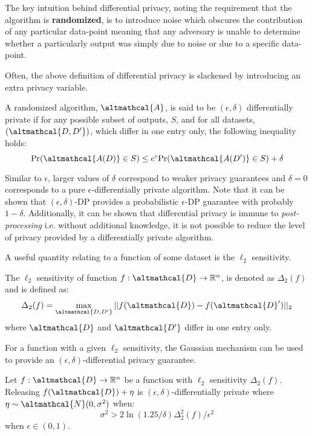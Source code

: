 The key intuition behind differential privacy, noting the requirement that the algorithm is \textbf{randomized}, is to introduce noise which obscures the contribution of any particular data-point meaning that any adversary is unable to determine whether a particularly output was simply due to noise or due to a specific data-point. 

Often, the above definition of differential privacy is slackened by introducing an extra privacy variable. 

\begin{definition}
	\label{def:epdp}
	 A randomized algorithm, $\altmathcal{A}$, is said to be $(\epsilon, \delta)$ differentially private if for any possible subset of outputs, $S$, and for all datasets, $(\altmathcal{D, D'})$, which differ in one entry only, the following inequality holds:
	\begin{equation}
	\text{Pr}(\altmathcal{A(D)} \in S) \leq e^\epsilon \text{Pr}(\altmathcal{A(D')} \in S) + \delta
	\end{equation}
\end{definition}
Similar to $\epsilon$, larger values of $\delta$ correspond to weaker privacy guarantees and $\delta=0$ corresponds to a pure $\epsilon$-differentially private algorithm. Note that it can be shown that $(\epsilon, \delta)$-DP provides a probabilistic $\epsilon$-DP guarantee with probably $1-\delta$. Additionally, it can be shown that differential privacy is immune to \emph{post-processing} i.e. without additional knowledge, it is not possible to reduce the level of privacy provided by a differentially private algorithm. \cite{foundations}

A useful quantity relating to a function of some dataset is the $\ell_2$ sensitivity. 
\begin{definition}
	The $\ell_2$ sensitivity of function $f: \altmathcal{D} \rightarrow \mathbb{R}^n$, is denoted as $\Delta_2(f)$ and is defined as:
	\begin{align}
		\Delta_2(f) = \max_{\altmathcal{D, D'}} || f(\altmathcal{D}) - f(\altmathcal{D}')||_2
	\end{align}
	where $\altmathcal{D}$ and $\altmathcal{D'}$ differ in one entry only. 
\end{definition}
For a function with a given $\ell_2$ sensitivity, the Gaussian mechanism can be used to provide an $(\epsilon, \delta)$-differential privacy guarantee. 
\begin{theorem}
	Let $f: \altmathcal{D} \rightarrow \mathbb{R}^n$ be a function with $\ell_2$ sensitivity $\Delta_2(f)$. Releasing $f(\altmathcal{D}) + \eta$ is $(\epsilon, \delta)$-differentially private where $\eta \sim \altmathcal{N}(0, \sigma^2)$ when:
	\begin{equation}
	\sigma^2 > 2 \ln (1.25/ \delta) \Delta_2^2(f)/\epsilon^2
	\label{eq:litreview-GaussianMech}
	\end{equation}
	when $\epsilon \in (0,1)$.
\end{theorem}
\cite{foundations}

